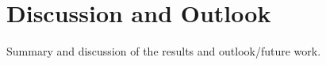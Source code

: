 \section{Discussion and Outlook}\label{sec:discussion}

Summary and discussion of the results and outlook/future work.

\lipsum[18-20]
